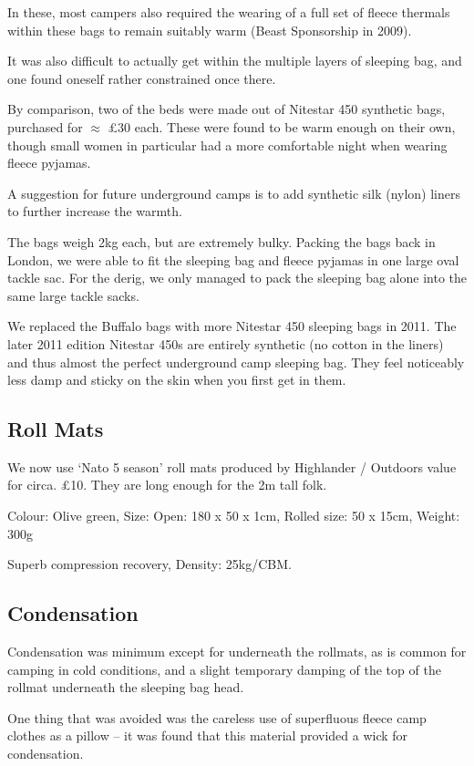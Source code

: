 In these, most campers also required the wearing of a full set of fleece thermals within these bags to remain suitably warm (Beast Sponsorship in 2009).

It was also difficult to actually get within the multiple layers of sleeping bag, and one found oneself rather constrained once there.

By comparison, two of the beds were made out of Nitestar 450 synthetic bags, purchased for $\approx$ £30 each. These were found to be warm enough on their own, though small women in particular had a more comfortable night when wearing fleece pyjamas.

A suggestion for future underground camps is to add synthetic silk (nylon) liners to further increase the warmth.

The bags weigh 2kg each, but are extremely bulky. Packing the bags back in London, we were able to fit the sleeping bag and fleece pyjamas in one large oval tackle sac. For the derig, we only managed to pack the sleeping bag alone into the same large tackle sacks.

We replaced the Buffalo bags with more Nitestar 450 sleeping bags in 2011. The later 2011 edition Nitestar 450s are entirely synthetic (no cotton in the liners) and thus almost the perfect underground camp sleeping bag. They feel noticeably less damp and sticky on the skin when you first get in them.


\subsection{Roll Mats}

We now use `Nato 5 season' roll mats produced by Highlander / Outdoors value for circa. £10. They are long enough for the 2m tall folk.

Colour: Olive green, Size: Open: 180 x 50 x 1cm, Rolled size: 50 x 15cm, Weight: 300g

Superb compression recovery, Density: 25kg/CBM.


\subsection{Condensation}

Condensation was minimum except for underneath the rollmats, as is common for camping in cold conditions, and a slight temporary damping of the top of the rollmat underneath the sleeping bag head.

One thing that was avoided was the careless use of superfluous fleece camp clothes as a pillow -- it was found that this material provided a wick for condensation.


